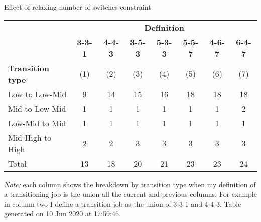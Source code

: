 \begin{center}
\begin{threeparttable}[!h]
\caption{Effect of relaxing number of switches constraint}
\begin{tabular}{lccccccc}
\toprule
\toprule
& \multicolumn{7}{c}{\textbf{Definition}} \\
\cline{2-8}
&\multicolumn{1}{c}{\textbf{3-3-1}}&\multicolumn{1}{c}{\textbf{4-4-3}}&\multicolumn{1}{c}{\textbf{3-5-3}}&\multicolumn{1}{c}{\textbf{5-3-3}}&\multicolumn{1}{c}{\textbf{5-5-7}}&\multicolumn{1}{c}{\textbf{4-6-7}}&\multicolumn{1}{c}{\textbf{6-4-7}} \\
\textbf{Transition type}&\multicolumn{1}{c}{(1)}&\multicolumn{1}{c}{(2)}&\multicolumn{1}{c}{(3)}&\multicolumn{1}{c}{(4)}&\multicolumn{1}{c}{(5)}&\multicolumn{1}{c}{(6)}&\multicolumn{1}{c}{(7)} \\
\midrule
\midrule
Low to Low-Mid&9&14&15&16&18&18&18 \\
Mid to Low-Mid&1&1&1&1&1&1&2 \\
Low-Mid to Mid&1&1&1&1&1&1&1 \\
Mid-High to High&2&2&3&3&3&3&3 \\
Total&13&18&20&21&23&23&24 \\
\bottomrule
\bottomrule
\end{tabular}
\begin{tablenotes}
\item \footnotesize \textit{Note:} each column shows the breakdown by transition type when my definition of a transitioning job is the union all the current and previous columns. For example in column two I define a transition job as the union of 3-3-1 and 4-4-3. Table generated on 10 Jun 2020 at 17:59:46.
\end{tablenotes}
\end{threeparttable}
\end{center}
